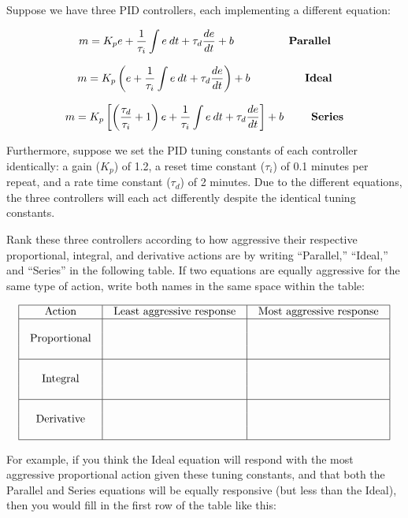 

Suppose we have three PID controllers, each implementing a different equation:

$$m = K_p e + {1 \over \tau_i} \int e \> dt + \tau_d {de \over dt} + b \hbox{\hskip 50pt {\bf Parallel}}$$

\vskip 10pt

$$m = K_p \left( e + {1 \over \tau_i} \int e \> dt + \tau_d {de \over dt} \right) + b \hbox{\hskip 50pt {\bf Ideal}}$$

\vskip 10pt

$$m = K_p \left[ \left({\tau_d \over \tau_i} + 1 \right) e + {1 \over \tau_i} \int e \> dt + \tau_d {de \over dt} \right] + b \hbox{\hskip 25pt {\bf Series}}$$

Furthermore, suppose we set the PID tuning constants of each controller identically: a gain ($K_p$) of 1.2, a reset time constant ($\tau_i$) of 0.1 minutes per repeat, and a rate time constant ($\tau_d$) of 2 minutes.  Due to the different equations, the three controllers will each act differently despite the identical tuning constants.

Rank these three controllers according to how aggressive their respective proportional, integral, and derivative actions are by writing ``Parallel,'' ``Ideal,'' and ``Series'' in the following table.  If two equations are equally aggressive for the same type of action, write both names in the same space within the table:


$$\vbox{\offinterlineskip
\halign{\strut
\vrule \quad\hfil # \ \hfil & 
\vrule \quad\hfil # \ \hfil & 
\vrule \quad\hfil # \ \hfil \vrule \cr
\noalign{\hrule}
%
Action & Least aggressive response & Most aggressive response \cr
%
\noalign{\hrule}
%
 &  &  \cr
Proportional &  &  \cr
 &  &  \cr
%
\noalign{\hrule}
%
 &  &  \cr
Integral &  &  \cr
 &  &  \cr
%
\noalign{\hrule}
%
 &  &  \cr
Derivative &  &  \cr
 &  &  \cr
%
\noalign{\hrule}
} %
}$$ %

For example, if you think the Ideal equation will respond with the most aggressive proportional action given these tuning constants, and that both the Parallel and Series equations will be equally responsive (but less than the Ideal), then you would fill in the first row of the table like this:

